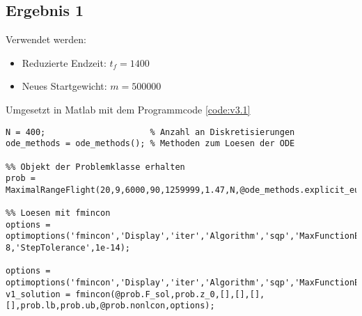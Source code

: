 \subsection{Ergebnis 1}
Verwendet werden:
\begin{itemize}
\item Reduzierte Endzeit: $t_f = 1400$
\item Neues Startgewicht: $m = 500000$
\end{itemize}
Umgesetzt in Matlab mit dem Programmcode \ref{code:v3.1}
\begin{lstlisting}[style=num_octave, caption={Matlab Programmcode für Versuch 3.}, label=code:v3.1]
N = 400;                     % Anzahl an Diskretisierungen
ode_methods = ode_methods(); % Methoden zum Loesen der ODE

%% Objekt der Problemklasse erhalten
prob = MaximalRangeFlight(20,9,6000,90,1259999,1.47,N,@ode_methods.explicit_euler);

%% Loesen mit fmincon
options = optimoptions('fmincon','Display','iter','Algorithm','sqp','MaxFunctionEvaluations',4000.0e+03,'MaxIterations',4.0e+05,'ConstraintTolerance',1e-8,'StepTolerance',1e-14);

options = optimoptions('fmincon','Display','iter','Algorithm','sqp','MaxFunctionEvaluations',1.000e+03,'MaxIterations',4.0e+05);
v1_solution = fmincon(@prob.F_sol,prob.z_0,[],[],[],[],prob.lb,prob.ub,@prob.nonlcon,options);
\end{lstlisting}
 










\newpage
